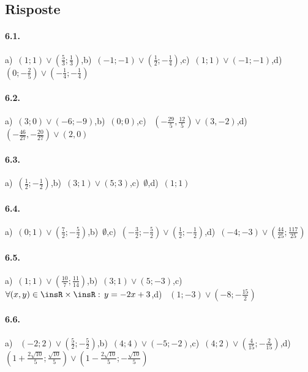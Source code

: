 \subsection{Risposte}
\paragraph{6.1.} a)~$\left(1;1\right)\vee \left(\frac 5 3;\frac 1 3\right)$,\quad b)~$\left(-1;-1\right)\vee \left(\frac 1 2;-\frac 1 4\right)$,\quad c)~$\left(1;1\right)\vee \left(-1;-1\right)$,\quad d)~$\left(0;-\frac 2 5\right)\vee \left(-\frac 1 4;-\frac 1 4\right)$

\paragraph{6.2.} a)~$\left(3;0\right)\vee \left(-6;-9\right)$,\quad b)~$\left(0;0\right)$,\quad c)~ $\left(-\frac{29} 5,\frac{12} 5\right)\vee (3,-2)$,\quad d)~$\left(-\frac{46}{27},-\frac{20}{27}\right)\vee (2,0)$

\paragraph{6.3.} a)~$\left(\frac 1 2;-\frac 1 2\right)$,\quad b)~$\left(3;1\right)\vee \left(5;3\right)$,\quad c)~$\emptyset $,\quad d)~$\left(1;1\right)$

\paragraph{6.4.} a)~$\left(0;1\right)\vee \left(\frac 7 2;-\frac 5 2\right)$,\quad b)~$\emptyset $,\quad c)~$\left(-\frac 3 2;-\frac 5 2\right)\vee \left(\frac 1 2;-\frac 1 2\right)$,\quad d)~$\left(-4;-3\right)\vee \left(\frac{44}{25};\frac{117}{25}\right)$

\paragraph{6.5.} a)~$\left(1;1\right)\vee \left(\frac{10} 7;\frac{11}{14}\right)$,\quad b)~$\left(3;1\right)\vee \left(5;-3\right)$,\quad c)~$ \forall (x,y)\in \insR \times \insR:\,y=-2x+3$,\quad d)~ $\left(1;-3\right)\vee \left(-8;-\frac{15} 2\right)$

\paragraph{6.6.} a)~ $\left(-2;2\right)\vee \left(\frac 5 2;-\frac 5 2\right)$,\quad b)~$\left(4;4\right)\vee \left(-5;-2\right)$,\quad c)~$\left(4;2\right)\vee \left(\frac 4{15};-\frac 2{15}\right)$,\quad d)~$\left(1+\frac{2\sqrt{10}} 5;\frac{\sqrt{10}} 5\right)\vee \left(1-\frac{2\sqrt{10}} 5;-\frac{\sqrt{10}} 5\right)$

